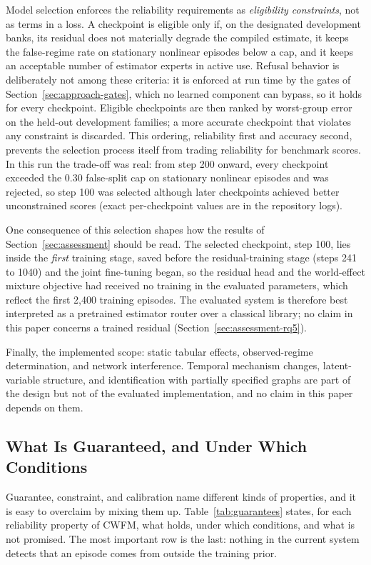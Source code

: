 \documentclass[electronics,article,submit,oneauthor]{Definitions/mdpi}
\begin{document}
Model selection enforces the reliability requirements as \emph{eligibility constraints}, not as terms in a loss. A checkpoint is eligible only if, on the designated development banks, its residual does not materially degrade the compiled estimate, it keeps the false-regime rate on stationary nonlinear episodes below a cap, and it keeps an acceptable number of estimator experts in active use. Refusal behavior is deliberately not among these criteria: it is enforced at run time by the gates of Section~\ref{sec:approach-gates}, which no learned component can bypass, so it holds for every checkpoint. Eligible checkpoints are then ranked by worst-group error on the held-out development families; a more accurate checkpoint that violates any constraint is discarded. This ordering, reliability first and accuracy second, prevents the selection process itself from trading reliability for benchmark scores. In this run the trade-off was real: from step 200 onward, every checkpoint exceeded the 0.30 false-split cap on stationary nonlinear episodes and was rejected, so step 100 was selected although later checkpoints achieved better unconstrained scores (exact per-checkpoint values are in the repository logs).

One consequence of this selection shapes how the results of Section~\ref{sec:assessment} should be read. The selected checkpoint, step 100, lies inside the \emph{first} training stage, saved before the residual-training stage (steps 241 to 1040) and the joint fine-tuning began, so the residual head and the world-effect mixture objective had received no training in the evaluated parameters, which reflect the first 2,400 training episodes. The evaluated system is therefore best interpreted as a pretrained estimator router over a classical library; no claim in this paper concerns a trained residual (Section~\ref{sec:assessment-rq5}).


Finally, the implemented scope: static tabular effects, observed-regime determination, and network interference. Temporal mechanism changes, latent-variable structure, and identification with partially specified graphs are part of the design but not of the evaluated implementation, and no claim in this paper depends on them.

\subsection{What Is Guaranteed, and Under Which Conditions}\label{sec:approach-guarantees}

Guarantee, constraint, and calibration name different kinds of properties, and it is easy to overclaim by mixing them up. Table~\ref{tab:guarantees} states, for each reliability property of CWFM, what holds, under which conditions, and what is not promised. The most important row is the last: nothing in the current system detects that an episode comes from outside the training prior.
\end{document}
